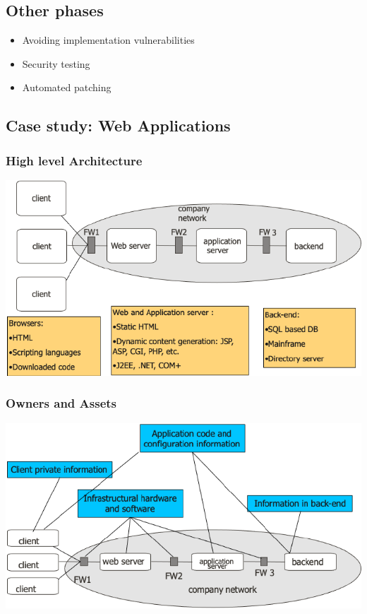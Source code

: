 \subsection{Other phases}
\begin{itemize}
    \item Avoiding implementation vulnerabilities
    \item Security testing
    \item Automated patching
\end{itemize}

\subsection{Case study: Web Applications}
\subsubsection{High level Architecture}
\includegraphics[width=\linewidth]{../img/web_application.png}
\subsubsection{Owners and Assets}
\includegraphics[width=\linewidth]{../img/web_application_owners_assets.png}

